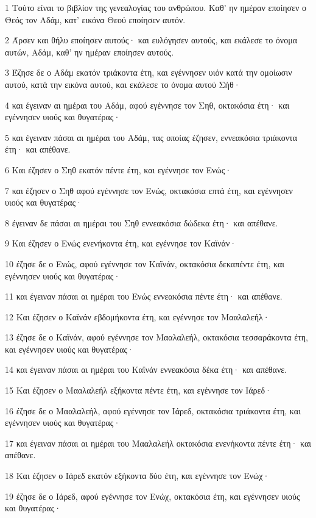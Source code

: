 \par 1 Τούτο είναι το βιβλίον της γενεαλογίας του ανθρώπου. Καθ' ην ημέραν εποίησεν ο Θεός τον Αδάμ, κατ' εικόνα Θεού εποίησεν αυτόν.
\par 2 Άρσεν και θήλυ εποίησεν αυτούς· και ευλόγησεν αυτούς, και εκάλεσε το όνομα αυτών, Αδάμ, καθ' ην ημέραν εποίησεν αυτούς.
\par 3 Έζησε δε ο Αδάμ εκατόν τριάκοντα έτη, και εγέννησεν υιόν κατά την ομοίωσιν αυτού, κατά την εικόνα αυτού, και εκάλεσε το όνομα αυτού Σήθ·
\par 4 και έγειναν αι ημέραι του Αδάμ, αφού εγέννησε τον Σηθ, οκτακόσια έτη· και εγέννησεν υιούς και θυγατέρας·
\par 5 και έγειναν πάσαι αι ημέραι του Αδάμ, τας οποίας έζησεν, εννεακόσια τριάκοντα έτη· και απέθανε.
\par 6 Και έζησεν ο Σηθ εκατόν πέντε έτη, και εγέννησε τον Ενώς·
\par 7 και έζησεν ο Σηθ αφού εγέννησε τον Ενώς, οκτακόσια επτά έτη, και εγέννησεν υιούς και θυγατέρας·
\par 8 έγειναν δε πάσαι αι ημέραι του Σηθ εννεακόσια δώδεκα έτη· και απέθανε.
\par 9 Και έζησεν ο Ενώς ενενήκοντα έτη, και εγέννησε τον Καϊνάν·
\par 10 έζησε δε ο Ενώς, αφού εγέννησε τον Καϊνάν, οκτακόσια δεκαπέντε έτη, και εγέννησεν υιούς και θυγατέρας·
\par 11 και έγειναν πάσαι αι ημέραι του Ενώς εννεακόσια πέντε έτη· και απέθανε.
\par 12 Και έζησεν ο Καϊνάν εβδομήκοντα έτη, και εγέννησε τον Μααλαλεήλ·
\par 13 έζησε δε ο Καϊνάν, αφού εγέννησε τον Μααλαλεήλ, οκτακόσια τεσσαράκοντα έτη, και εγέννησεν υιούς και θυγατέρας·
\par 14 και έγειναν πάσαι αι ημέραι του Καϊνάν εννεακόσια δέκα έτη· και απέθανε.
\par 15 Και έζησεν ο Μααλαλεήλ εξήκοντα πέντε έτη, και εγέννησε τον Ιάρεδ·
\par 16 έζησε δε ο Μααλαλεήλ, αφού εγέννησε τον Ιάρεδ, οκτακόσια τριάκοντα έτη, και εγέννησεν υιούς και θυγατέρας·
\par 17 και έγειναν πάσαι αι ημέραι του Μααλαλεήλ οκτακόσια ενενήκοντα πέντε έτη· και απέθανε.
\par 18 Και έζησεν ο Ιάρεδ εκατόν εξήκοντα δύο έτη, και εγέννησε τον Ενώχ·
\par 19 έζησε δε ο Ιάρεδ, αφού εγέννησε τον Ενώχ, οκτακόσια έτη, και εγέννησεν υιούς και θυγατέρας·
